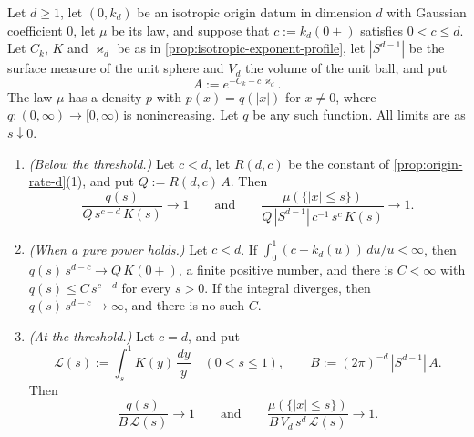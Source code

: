 \begin{proposition}
\label{prop:origin-rate-profile-d}
\leanok
Let $d \ge 1$, let $(0, k_d)$ be an isotropic origin datum in dimension $d$ with Gaussian
coefficient $0$, let $\mu$ be its law, and suppose that $c := k_d(0{+})$ satisfies $0 < c \le d$.
Let $C_k$, $K$ and $\varkappa_d$ be as in \ref{prop:isotropic-exponent-profile}, let $|S^{d-1}|$
be the surface measure of the unit sphere and $V_d$ the volume of the unit ball, and put
\[
  A := e^{-C_k - c\,\varkappa_d} .
\]
The law $\mu$ has a density $p$ with $p(x) = q(|x|)$ for $x \ne 0$, where
$q : (0,\infty) \to [0,\infty)$ is nonincreasing. Let $q$ be any such function. All limits are as
$s \downarrow 0$.
\begin{enumerate}
\item \emph{(Below the threshold.)} Let $c < d$, let $R(d,c)$ be the constant of
\ref{prop:origin-rate-d}(1), and put $Q := R(d,c)\,A$. Then
\[
  \frac{q(s)}{Q\,s^{c-d}\,K(s)} \to 1
  \qquad\text{and}\qquad
  \frac{\mu(\{|x| \le s\})}{Q\,|S^{d-1}|\,c^{-1}\,s^{c}\,K(s)} \to 1 .
\]
\item \emph{(When a pure power holds.)} Let $c < d$. If
$\int_0^1 (c - k_d(u))\,du/u < \infty$, then $q(s)\,s^{d-c} \to Q\,K(0{+})$, a finite positive
number, and there is $C < \infty$ with $q(s) \le C\,s^{c-d}$ for every $s > 0$. If the integral
diverges, then $q(s)\,s^{d-c} \to \infty$, and there is no such $C$.
\item \emph{(At the threshold.)} Let $c = d$, and put
\[
  \mathcal{L}(s) := \int_s^1 K(y)\,\frac{dy}{y} \quad (0 < s \le 1), \qquad
  B := (2\pi)^{-d}\,|S^{d-1}|\,A .
\]
Then
\[
  \frac{q(s)}{B\,\mathcal{L}(s)} \to 1
  \qquad\text{and}\qquad
  \frac{\mu(\{|x| \le s\})}{B\,V_d\,s^{d}\,\mathcal{L}(s)} \to 1 .
\]
\end{enumerate}
\end{proposition}
